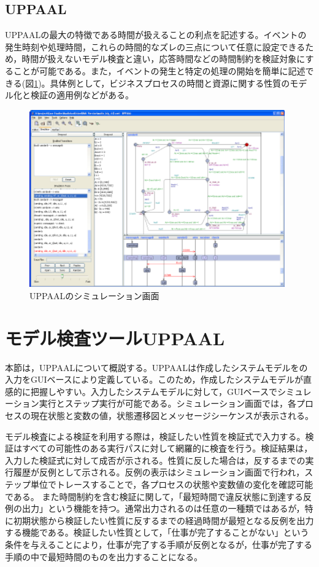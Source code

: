 \documentclass{tpu-sotu}
\begin{document}
	\subsection{UPPAAL}
	UPPAALの最大の特徴である時間が扱えることの利点を記述する。イベントの発生時刻や処理時間，これらの時間的なズレの三点について任意に設定できるため，時間が扱えないモデル検査と違い，応答時間などの時間制約を検証対象にすることが可能である。また，イベントの発生と特定の処理の開始を簡単に記述できる(図\ref{uppaal})。具体例として，ビジネスプロセスの時間と資源に関する性質のモデル化と検証の適用例などがある\cite{a9}。
	\begin{figure}[htbp]
	\centering
	\includegraphics[width=110mm]{uppaal.png}
	\caption{UPPAALのシミュレーション画面\cite{u2}}
	\label{uppaal}
	\end{figure}
	\section{モデル検査ツールUPPAAL}
	本節は，UPPAALについて概説する。UPPAALは作成したシステムモデルをの入力をGUIベースにより定義している。このため，作成したシステムモデルが直感的に把握しやすい。入力したシステムモデルに対して，GUIベースでシミュレーション実行とステップ実行が可能である。シミュレーション画面では，各プロセスの現在状態と変数の値，状態遷移図とメッセージシーケンスが表示される。
	
	モデル検査による検証を利用する際は，検証したい性質を検証式で入力する。検証はすべての可能性のある実行パスに対して網羅的に検査を行う。検証結果は，入力した検証式に対して成否が示される。性質に反した場合は，反するまでの実行履歴が反例として示される。反例の表示はシミュレーション画面で行われ，ステップ単位でトレースすることで，各プロセスの状態や変数値の変化を確認可能である。
	また時間制約を含む検証に関して，「最短時間で違反状態に到達する反例の出力」という機能を持つ。通常出力されるのは任意の一種類ではあるが，特に初期状態から検証したい性質に反するまでの経過時間が最短となる反例を出力する機能である。検証したい性質として，「仕事が完了することがない」という条件を与えることにより，仕事が完了する手順が反例となるが，仕事が完了する手順の中で最短時間のものを出力することになる。
\end{document}
